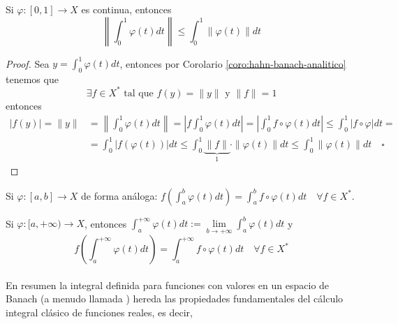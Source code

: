 \begin{prop}
    Si $\varphi: [0, 1] \to X$ es continua, entonces 
    \begin{equation*}
        \left\| \int_{0}^{1} \varphi(t) dt \right\| \leq \int_{0}^{1} \|\varphi(t)\| dt
    \end{equation*}

\begin{proof}
    Sea $y = \int_{0}^{1} \varphi(t) dt$, entonces por Corolario \ref{coro:hahn-banach-analitico} tenemos que
    \begin{equation*}
        \exists f\in X^* \text{ tal que } f(y) = \|y\| \text{ y } \|f\| = 1
    \end{equation*}
    entonces
    \begin{align*}
        |f(y)| = \|y\| &= \left\| \int_{0}^{1} \varphi(t) dt \right\| = \left| f \int_{0}^{1} \varphi(t) dt \right| = \left| \int_{0}^{1} f \circ \varphi(t) dt \right| \leq \int_{0}^{1} |f \circ \varphi| dt = \\
        &= \int_{0}^{1} |f(\varphi(t))| dt \leq \int_{0}^{1} \underbrace{\|f\|}_{1} \cdot \|\varphi(t)\| dt \leq \int_{0}^{1} \|\varphi(t)\| dt \quad \square
    \end{align*}
\end{proof}
\end{prop}



\noindent Si $\varphi: [a, b] \to X$ de forma análoga: $f\left( \int_{a}^{b} \varphi(t) dt \right) = \int_{a}^{b} f \circ \varphi(t) dt \quad \forall f \in X^*$.

\vspace{0.4cm}

\noindent Si $\varphi: [a, +\infty) \to X$, entonces $\int_{a}^{+\infty} \varphi(t) dt := \lim\limits_{b \to +\infty} \int_{a}^{b} \varphi(t) dt$ y
\[ f\left( \int_{a}^{+\infty} \varphi(t) dt \right) = \int_{a}^{+\infty} f \circ \varphi(t) dt \quad \forall f \in X^* \] \\

\noindent
En resumen la integral definida para funciones con valores en un espacio de Banach (a menudo llamada ) hereda las propiedades fundamentales del cálculo integral clásico de funciones reales, es decir, 

